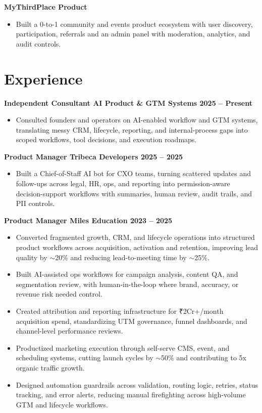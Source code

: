 \documentclass[10pt,a4paper]{article}
\begin{document}
\textbf{MyThirdPlace \textbar{} Product}
\begin{itemize}
  \item Built a 0-to-1 community and events product ecosystem with user discovery, participation, referrals and an admin panel with moderation, analytics, and audit controls.
\end{itemize}

\section*{Experience}

\textbf{Independent Consultant \textbar{} AI Product \& GTM Systems \textbar{} 2025 -- Present}
\begin{itemize}
  \item Consulted founders and operators on AI-enabled workflow and GTM systems, translating messy CRM, lifecycle, reporting, and internal-process gaps into scoped workflows, tool decisions, and execution roadmaps.
\end{itemize}

\textbf{Product Manager \textbar{} Tribeca Developers \textbar{} 2025 -- 2025}
\begin{itemize}
  \item Built a Chief-of-Staff AI bot for CXO teams, turning scattered updates and follow-ups across legal, HR, ops, and reporting into permission-aware decision-support workflows with summaries, human review, audit trails, and PII controls.
\end{itemize}

\textbf{Product Manager \textbar{} Miles Education \textbar{} 2023 -- 2025}
\begin{itemize}
  \item Converted fragmented growth, CRM, and lifecycle operations into structured product workflows across acquisition, activation and retention, improving lead quality by $\sim$20\% and reducing lead-to-meeting time by $\sim$25\%.
  \item Built AI-assisted ops workflows for campaign analysis, content QA, and segmentation review, with human-in-the-loop where brand, accuracy, or revenue risk needed control.
  \item Created attribution and reporting infrastructure for ₹2Cr+/month acquisition spend, standardizing UTM governance, funnel dashboards, and channel-level performance reviews.
  \item Productized marketing execution through self-serve CMS, event, and scheduling systems, cutting launch cycles by $\sim$50\% and contributing to 5x organic traffic growth.
  \item Designed automation guardrails across validation, routing logic, retries, status tracking, and error alerts, reducing manual firefighting across high-volume GTM and lifecycle workflows.
\end{itemize}
\end{document}
